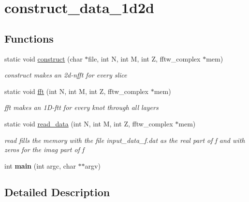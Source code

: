 \hypertarget{group__applications__mri3d__construct__data__1d2d}{\section{construct\-\_\-data\-\_\-1d2d}
\label{group__applications__mri3d__construct__data__1d2d}
}
\subsection*{Functions}
\begin{DoxyCompactItemize}
\item 
\hypertarget{group__applications__mri3d__construct__data__1d2d_ga3b7e53294d00c663429518cb2f7c7791}{static void \hyperlink{group__applications__mri3d__construct__data__1d2d_ga3b7e53294d00c663429518cb2f7c7791}{construct} (char $\ast$file, int N, int M, int Z, fftw\-\_\-complex $\ast$mem)}\label{group__applications__mri3d__construct__data__1d2d_ga3b7e53294d00c663429518cb2f7c7791}

\begin{DoxyCompactList}\small\item\em construct makes an 2d-\/nfft for every slice \end{DoxyCompactList}\item 
\hypertarget{group__applications__mri3d__construct__data__1d2d_gafa82bf5df93804a1760082b88492b8d5}{static void \hyperlink{group__applications__mri3d__construct__data__1d2d_gafa82bf5df93804a1760082b88492b8d5}{fft} (int N, int M, int Z, fftw\-\_\-complex $\ast$mem)}\label{group__applications__mri3d__construct__data__1d2d_gafa82bf5df93804a1760082b88492b8d5}

\begin{DoxyCompactList}\small\item\em fft makes an 1\-D-\/ftt for every knot through all layers \end{DoxyCompactList}\item 
\hypertarget{group__applications__mri3d__construct__data__1d2d_ga324751353a7eefbe2ad622201dd52d5f}{static void \hyperlink{group__applications__mri3d__construct__data__1d2d_ga324751353a7eefbe2ad622201dd52d5f}{read\-\_\-data} (int N, int M, int Z, fftw\-\_\-complex $\ast$mem)}\label{group__applications__mri3d__construct__data__1d2d_ga324751353a7eefbe2ad622201dd52d5f}

\begin{DoxyCompactList}\small\item\em read fills the memory with the file input\-\_\-data\-\_\-f.\-dat as the real part of f and with zeros for the imag part of f \end{DoxyCompactList}\item 
\hypertarget{group__applications__mri3d__construct__data__1d2d_ga3c04138a5bfe5d72780bb7e82a18e627}{int {\bfseries main} (int argc, char $\ast$$\ast$argv)}\label{group__applications__mri3d__construct__data__1d2d_ga3c04138a5bfe5d72780bb7e82a18e627}

\end{DoxyCompactItemize}


\subsection{Detailed Description}
